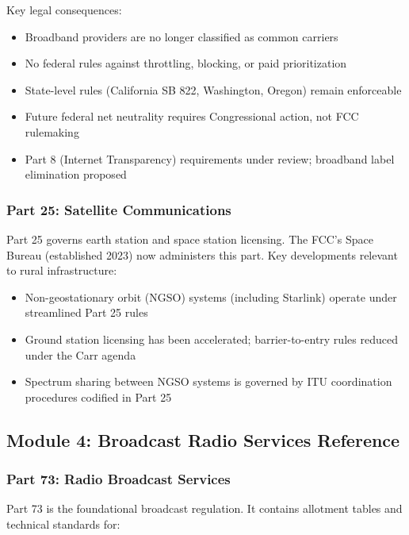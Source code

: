 \documentclass[11pt,letterpaper]{article}
\begin{document}
Key legal consequences:
\begin{itemize}[leftmargin=1.5em]
  \item Broadband providers are no longer classified as common carriers
  \item No federal rules against throttling, blocking, or paid prioritization
  \item State-level rules (California SB 822, Washington, Oregon) remain enforceable
  \item Future federal net neutrality requires Congressional action, not FCC rulemaking
  \item Part 8 (Internet Transparency) requirements under review; broadband label elimination proposed
\end{itemize}

\subsubsection{Part 25: Satellite Communications}

Part 25 governs earth station and space station licensing. The FCC's Space Bureau (established 2023) now administers this part. Key developments relevant to rural infrastructure:
\begin{itemize}[leftmargin=1.5em]
  \item Non-geostationary orbit (NGSO) systems (including Starlink) operate under streamlined Part 25 rules
  \item Ground station licensing has been accelerated; barrier-to-entry rules reduced under the Carr agenda
  \item Spectrum sharing between NGSO systems is governed by ITU coordination procedures codified in Part 25
\end{itemize}

\subsection{Module 4: Broadcast Radio Services Reference}

\subsubsection{Part 73: Radio Broadcast Services}

Part 73 is the foundational broadcast regulation. It contains allotment tables and technical standards for:
\end{document}
